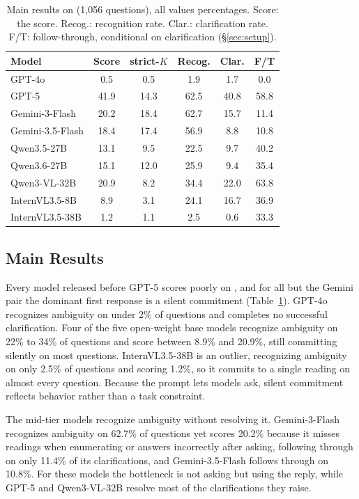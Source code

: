 \begin{table}[t]
\centering
\small
\setlength{\tabcolsep}{4.0pt}
\begin{tabular}{@{}lccccc@{}}
\toprule
Model & Score & strict-$K$ & Recog. & Clar. & F/T \\
\midrule
GPT-4o & 0.5 & 0.5 & 1.9 & 1.7 & 0.0 \\
GPT-5 & 41.9 & 14.3 & 62.5 & 40.8 & 58.8 \\
Gemini-3-Flash & 20.2 & 18.4 & 62.7 & 15.7 & 11.4 \\
Gemini-3.5-Flash & 18.4 & 17.4 & 56.9 & 8.8 & 10.8 \\
Qwen3.5-27B & 13.1 & 9.5 & 22.5 & 9.7 & 40.2 \\
Qwen3.6-27B & 15.1 & 12.0 & 25.9 & 9.4 & 35.4 \\
Qwen3-VL-32B & 20.9 & 8.2 & 34.4 & 22.0 & 63.8 \\
InternVL3.5-8B & 8.9 & 3.1 & 24.1 & 16.7 & 36.9 \\
InternVL3.5-38B & 1.2 & 1.1 & 2.5 & 0.6 & 33.3 \\
\bottomrule
\end{tabular}
\caption{Main results on \bench{} (1{,}056 questions), all values percentages. Score: the \bench{} score. Recog.: recognition rate. Clar.: clarification rate. F/T: follow-through, conditional on clarification (\S\ref{sec:setup}).}
\label{tab:main}
\end{table}



\subsection{Main Results}
\label{sec:mainresults}

Every model released before GPT-5 scores poorly on \bench{}, and for all but the Gemini pair the dominant first response is a silent commitment (Table~\ref{tab:main}). GPT-4o recognizes ambiguity on under 2\% of questions and completes no successful clarification. Four of the five open-weight base models recognize ambiguity on 22\% to 34\% of questions and score between 8.9\% and 20.9\%, still committing silently on most questions. InternVL3.5-38B is an outlier, recognizing ambiguity on only 2.5\% of questions and scoring 1.2\%, so it commits to a single reading on almost every question. Because the prompt lets models ask, silent commitment reflects behavior rather than a task constraint.

The mid-tier models recognize ambiguity without resolving it. Gemini-3-Flash recognizes ambiguity on 62.7\% of questions yet scores 20.2\% because it misses readings when enumerating or answers incorrectly after asking, following through on only 11.4\% of its clarifications, and Gemini-3.5-Flash follows through on 10.8\%. For these models the bottleneck is not asking but using the reply, while GPT-5 and Qwen3-VL-32B resolve most of the clarifications they raise.

